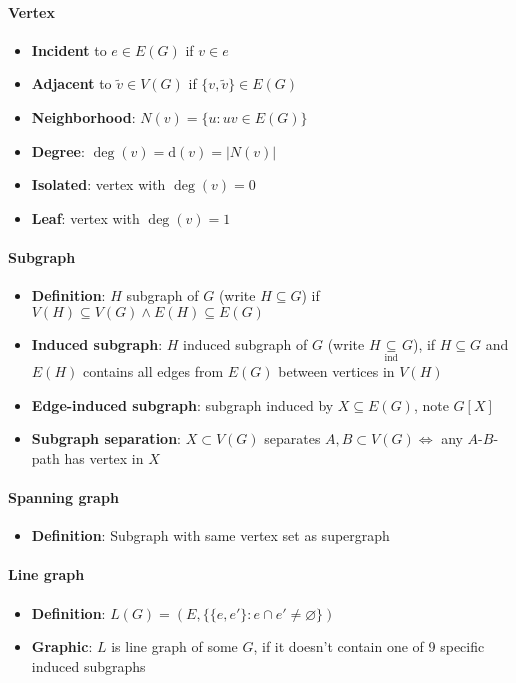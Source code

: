 \paragraph{Vertex}
\begin{itemize}
  \item \textbf{Incident} to $ e \in E(G) $ if $ v \in e $
  \item \textbf{Adjacent} to $ \widetilde{v} \in V(G) $ if $ \{ v, \widetilde{v} \} \in E(G) $
  \item \textbf{Neighborhood}: $ N(v) = \{ u: uv \in E(G) \} $
  \item \textbf{Degree}: $ \deg(v) = \text{d}(v) = \vert N(v) \vert $
  \item \textbf{Isolated}: vertex with $ \deg(v) = 0 $
  \item \textbf{Leaf}: vertex with $ \deg(v) = 1 $
\end{itemize}

\paragraph{Subgraph}
\begin{itemize}
  \item \textbf{Definition}: $ H $ subgraph of $ G $ (write $ H \subseteq G $) if $ V(H) \subseteq V(G) \wedge E(H) \subseteq E(G) $
  \item \textbf{Induced subgraph}: $ H $ induced subgraph of $ G $ (write $ H \underset{\text{ind}}{\subseteq} G $), if $ H \subseteq G $ and $ E(H) $ contains all edges from $ E(G) $ between vertices in $ V(H) $
  \item \textbf{Edge-induced subgraph}: subgraph induced by $ X \subseteq E(G) $, note $ G[X] $
  \item \textbf{Subgraph separation}: $ X \subset V(G) $ separates $ A,B \subset V(G) \Leftrightarrow $ any $ A $-$ B $-path has vertex in $ X $
\end{itemize}

\paragraph{Spanning graph}
\begin{itemize}
  \item \textbf{Definition}: Subgraph with same vertex set as supergraph 
\end{itemize}

\paragraph{Line graph}
\begin{itemize}
  \item \textbf{Definition}: $ L(G) = (E, \{ \{ e, e' \} : e \cap e' \neq \varnothing \}) $ 
  \item \textbf{Graphic}: $ L $ is line graph of some $ G $, if it doesn't contain one of 9 specific induced subgraphs
\end{itemize}

